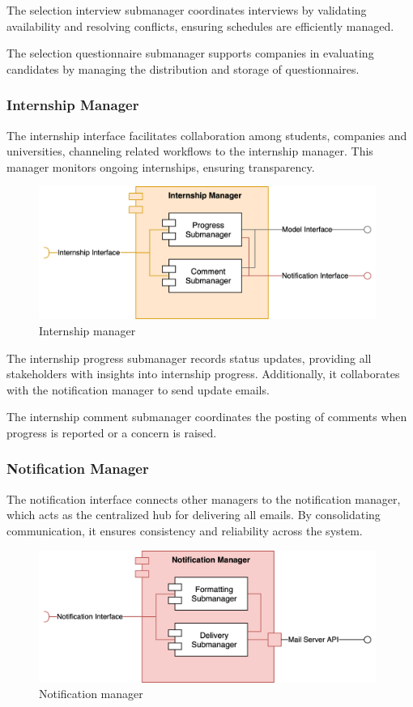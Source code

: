 The selection interview submanager coordinates interviews by validating availability and resolving conflicts, ensuring schedules are efficiently managed.

The selection questionnaire submanager supports companies in evaluating candidates by managing the distribution and storage of questionnaires.

\subsubsection{Internship Manager}
The internship interface facilitates collaboration among students, companies and universities, channeling related workflows to the internship manager.
This manager monitors ongoing internships, ensuring transparency.

\begin{figure}[h]
    \centering
    \includegraphics[width=11cm]{images/managers/internship.png}
    \caption{Internship manager}
\end{figure}

The internship progress submanager records status updates, providing all stakeholders with insights into internship progress.
Additionally, it collaborates with the notification manager to send update emails.

The internship comment submanager coordinates the posting of comments when progress is reported or a concern is raised.

\subsubsection{Notification Manager}
The notification interface connects other managers to the notification manager, which acts as the centralized hub for delivering all emails.
By consolidating communication, it ensures consistency and reliability across the system.

\begin{figure}[h]
    \centering
    \includegraphics[width=11cm]{images/managers/notification.png}
    \caption{Notification manager}
\end{figure}

